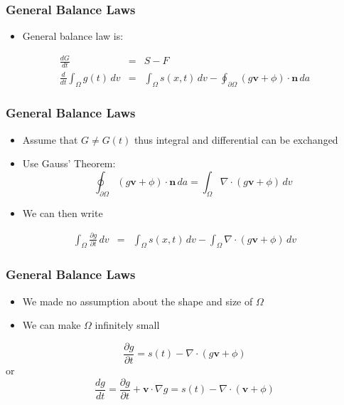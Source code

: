\documentclass[hide notes,intlimits]{beamer}
\begin{document}
\begin{frame}
  \frametitle{General Balance Laws}
  \begin{itemize}
 \item General balance law is:
  \end{itemize}
  \begin{eqnarray}
    \frac{dG}{dt} &=& S - F \\[1em]
    \frac{d}{dt} \int_{\Omega} g(t)\,dv &=& \int_{\Omega} s(x,t)\,d v - \oint_{\partial \Omega} \left(g\mathbf{v} + \phi\right) \cdot \mathbf{n}\,da
  \end{eqnarray}
\end{frame}

\begin{frame}
  \frametitle{General Balance Laws}
  \begin{itemize}
  \item Assume that $G \ne G(t)$ thus integral and differential can be exchanged
  \item Use Gauss' Theorem:
    \begin{displaymath}
      \oint_{\partial \Omega} \left(g\mathbf{v} + \phi\right) \cdot \mathbf{n}\,da = \int_{\Omega} \nabla \cdot \left(g\mathbf{v} + \phi\right)\,dv
   \end{displaymath}
  \item We can then write
  \end{itemize}
  \begin{eqnarray}
   \int_{\Omega} \frac{\partial g}{\partial t}\,dv &=& \int_{\Omega} s(x,t)\,d v - \int_{\Omega} \nabla \cdot \left(g\mathbf{v} + \phi\right)\,dv
  \end{eqnarray}
\end{frame}

\begin{frame}
  \frametitle{General Balance Laws}
  \begin{itemize}
  \item We made no assumption about the shape and size of $\Omega$ 
  \item We can make $\Omega$ infinitely small
  \end{itemize}
  \begin{equation}
    \frac{\partial g}{\partial t} = s(t)- \nabla \cdot \left(g\mathbf{v} + \phi\right)
  \end{equation}
  or
  \begin{equation}
    \frac{d g}{d t} = \frac{\partial g}{\partial t} + \mathbf{v}\cdot \nabla g = s(t)- \nabla \cdot  \left(\mathbf{v} + \phi\right)
  \end{equation}
\end{frame}
\end{document}
